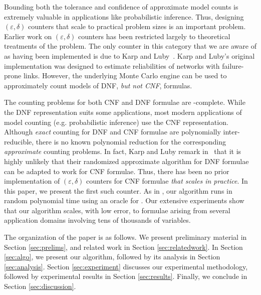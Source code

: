Bounding both the tolerance and confidence of approximate model counts
is extremely valuable in applications like probabilistic inference.
Thus, designing $(\varepsilon, \delta)$ counters that scale to
practical problem sizes is an important problem.  Earlier work on
$(\varepsilon, \delta)$ counters has been restricted largely to
theoretical treatments of the problem.  The only counter in this
category that we are aware of as having been implemented is due to
Karp and Luby~\cite{LubyThesis83}.  Karp and Luby's original
implementation was designed to estimate reliabilities of networks with
failure-prone links.  However, the underlying Monte Carlo engine can
be used to approximately count models of DNF, \emph{but not CNF},
formulas.

The counting problems for both CNF and DNF formulae are
{\sharpP}-complete. While the DNF representation suits some
applications, most modern applications of model counting (e.g.
probabilistic inference) use the CNF representation.  Although
\emph{exact} counting for DNF and CNF formulae are polynomially
inter-reducible, there is no known polynomial reduction for the
corresponding \emph{approximate} counting problems.  In fact, Karp and
Luby remark in~\cite{KarpLuby1989}  that it is highly unlikely that their
randomized approximate algorithm for DNF formulae can be adapted to
work for CNF formulae.  Thus, there has been no prior implementation
of $(\varepsilon, \delta)$ counters for CNF formulae \emph{that scales in
practice}.  In this paper, we present the first such counter. As in
\cite{Jerr}, our algorithm runs in random polynomial time using an
oracle for {\SAT}. Our extensive experiments show that our algorithm
scales, with low error, to formulae arising from several application domains involving tens of thousands of
variables.

The organization of the paper is as follows. We present preliminary
material in Section \ref{sec:prelims}, and related work in Section
\ref{sec:relatedwork}. In Section \ref{sec:algo}, we present our
algorithm, followed by its analysis in Section \ref{sec:analysis}.
Section \ref{sec:experiment} discusses our experimental methodology,
followed by experimental results in Section \ref{sec:results}. Finally, we conclude in Section \ref{sec:discussion}.
